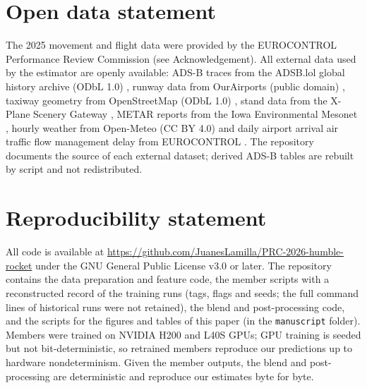 \documentclass[
  manuscript=article,  %
  layout=preprint,  %
  year=20xx,
  volume=x,
]{extra/joas}
\begin{document}
\section*{Open data statement}
The 2025 movement and flight data were provided by the EUROCONTROL Performance Review Commission (see Acknowledgement). All external data used by the estimator are openly available: ADS-B traces from the ADSB.lol global history archive (ODbL 1.0) \cite{adsblol2026historical}, runway data from OurAirports (public domain) \cite{ourairports2026open}, taxiway geometry from OpenStreetMap (ODbL 1.0) \cite{haklay2008openstreetmap}, stand data from the X-Plane Scenery Gateway \cite{xplane2026scenery}, METAR reports from the Iowa Environmental Mesonet \cite{iem2026download}, hourly weather from Open-Meteo (CC BY 4.0) \cite{zippenfenig2023openmeteo} and daily airport arrival air traffic flow management delay from EUROCONTROL \cite{eurocontrol2026airport}. The repository documents the source of each external dataset; derived ADS-B tables are rebuilt by script and not redistributed.

\section*{Reproducibility statement}
All code is available at \url{https://github.com/JuanesLamilla/PRC-2026-humble-rocket} under the GNU General Public License v3.0 or later. The repository contains the data preparation and feature code, the member scripts with a reconstructed record of the training runs (tags, flags and seeds; the full command lines of historical runs were not retained), the blend and post-processing code, and the scripts for the figures and tables of this paper (in the \texttt{manuscript} folder). Members were trained on NVIDIA H200 and L40S GPUs; GPU training is seeded but not bit-deterministic, so retrained members reproduce our predictions up to hardware nondeterminism. Given the member outputs, the blend and post-processing are deterministic and reproduce our estimates byte for byte.

\printbibliography
\end{document}
